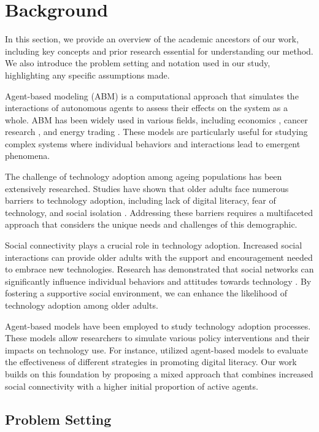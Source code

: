 \documentclass{article} %
\begin{document}
\section{Background}
\label{sec:background}

In this section, we provide an overview of the academic ancestors of our work, including key concepts and prior research essential for understanding our method. We also introduce the problem setting and notation used in our study, highlighting any specific assumptions made.

Agent-based modeling (ABM) is a computational approach that simulates the interactions of autonomous agents to assess their effects on the system as a whole. ABM has been widely used in various fields, including economics \citep{poledna2023economic}, cancer research \citep{west2023agent}, and energy trading \citep{zhou2023peer}. These models are particularly useful for studying complex systems where individual behaviors and interactions lead to emergent phenomena.

The challenge of technology adoption among ageing populations has been extensively researched. Studies have shown that older adults face numerous barriers to technology adoption, including lack of digital literacy, fear of technology, and social isolation \citep{park2023generative}. Addressing these barriers requires a multifaceted approach that considers the unique needs and challenges of this demographic.

Social connectivity plays a crucial role in technology adoption. Increased social interactions can provide older adults with the support and encouragement needed to embrace new technologies. Research has demonstrated that social networks can significantly influence individual behaviors and attitudes towards technology \citep{shanahan2023role}. By fostering a supportive social environment, we can enhance the likelihood of technology adoption among older adults.

Agent-based models have been employed to study technology adoption processes. These models allow researchers to simulate various policy interventions and their impacts on technology use. For instance, \citet{liu2023agentbench} utilized agent-based models to evaluate the effectiveness of different strategies in promoting digital literacy. Our work builds on this foundation by proposing a mixed approach that combines increased social connectivity with a higher initial proportion of active agents.

\subsection{Problem Setting}
\label{sec:problem_setting}
\end{document}
